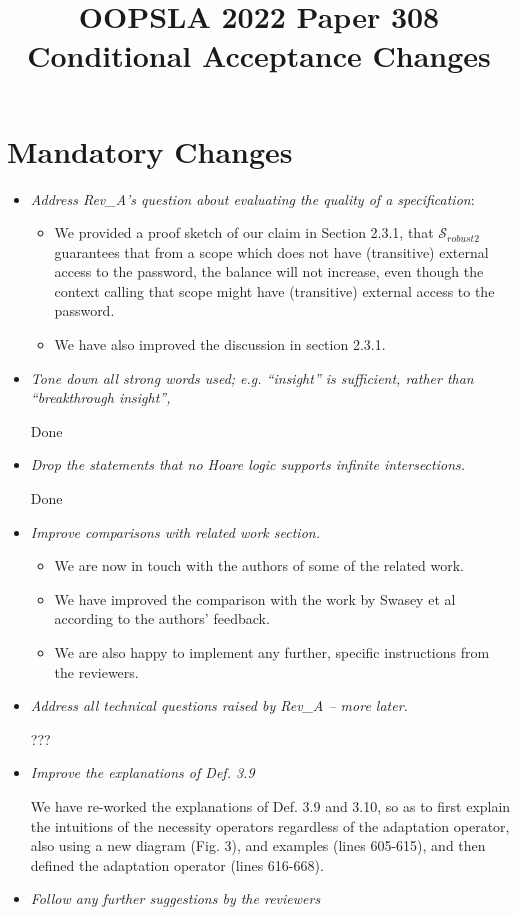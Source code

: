 \documentclass[11pt]{amsart}
\title{OOPSLA 2022 Paper 308 Conditional Acceptance Changes}
\begin{document}
\maketitle

\section{Mandatory Changes}

\begin{itemize}
\item
\emph{Address Rev\_A’s question about evaluating the quality of a specification}:

\begin{itemize}
\item
We provided a proof sketch of our claim in Section 2.3.1, that ${\mathcal S}_{robust2}$ guarantees that from a scope which does not
have (transitive) external access to the password, the balance will not increase, even though the context calling that scope might have
(transitive) external access to the password.

\item
We have also improved the discussion in section 2.3.1. 
\end{itemize}

\item
\emph{Tone down all strong words used;  e.g. “insight” is sufficient, rather than “breakthrough insight”,}

Done
\item
\emph{Drop the statements that no Hoare logic supports infinite intersections.}

Done
\item
\emph{Improve comparisons with related work section.}

\begin{itemize}
\item
We are now in touch with  the authors of some of the related work. 

\item
We have improved the comparison with the work by Swasey et al according to the authors' feedback. 

\item
We are also happy to implement any further, specific instructions from the reviewers. 
\end{itemize}

\item
\emph{Address all technical questions raised by Rev\_A -- more later.}

???

\item
\emph{Improve the explanations of Def. 3.9}

We have re-worked the explanations of Def. 3.9  and 3.10, so as to first explain the intuitions of the necessity operators regardless of the adaptation operator, also using a new  diagram (Fig. 3), and examples (lines  605-615), and then defined the adaptation operator (lines 616-668).
\item
\emph{Follow any further suggestions by the reviewers}
\end{itemize}




 
\end{document}
